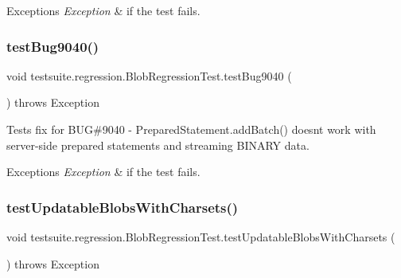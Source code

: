 \begin{DoxyExceptions}{Exceptions}
{\em Exception} & if the test fails. \\
\hline
\end{DoxyExceptions}
\mbox{\label{classtestsuite_1_1regression_1_1_blob_regression_test_ac14a4cb77c1dd15dae977435a20e0880}} 
\subsubsection{\texorpdfstring{test\+Bug9040()}{testBug9040()}}
{\footnotesize\ttfamily void testsuite.\+regression.\+Blob\+Regression\+Test.\+test\+Bug9040 (\begin{DoxyParamCaption}{ }\end{DoxyParamCaption}) throws Exception}

Tests fix for B\+UG\#9040 -\/ Prepared\+Statement.\+add\+Batch() doesn\textquotesingle{}t work with server-\/side prepared statements and streaming B\+I\+N\+A\+RY data.


\begin{DoxyExceptions}{Exceptions}
{\em Exception} & if the test fails. \\
\hline
\end{DoxyExceptions}
\mbox{\label{classtestsuite_1_1regression_1_1_blob_regression_test_aa201dca2fdcf014a75210d531656ab98}} 
\subsubsection{\texorpdfstring{test\+Updatable\+Blobs\+With\+Charsets()}{testUpdatableBlobsWithCharsets()}}
{\footnotesize\ttfamily void testsuite.\+regression.\+Blob\+Regression\+Test.\+test\+Updatable\+Blobs\+With\+Charsets (\begin{DoxyParamCaption}{ }\end{DoxyParamCaption}) throws Exception}


